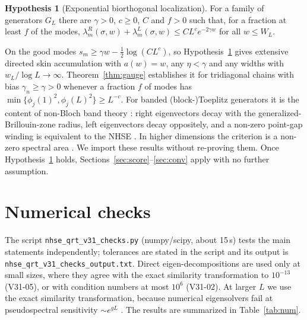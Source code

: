 \documentclass[11pt]{article}
\theoremstyle{definition}
\newtheorem{hypothesis}{Hypothesis}
\theoremstyle{remark}
\begin{document}
\begin{hypothesis}[Exponential biorthogonal localization]\label{hyp:H}
For a family of generators $G_L$ there are $\gamma>0$, $c\ge0$, $C$ and $f>0$ such that, for a fraction at least $f$ of the modes, $\lambda^R_m(\sigma,w)+\lambda^L_m(\sigma,w)\le CL^ce^{-2\gamma w}$ for all $w\le W_L$.
\end{hypothesis}

On the good modes $s_m\ge\gamma w-\frac12\log(CL^c)$, so Hypothesis~\ref{hyp:H} gives extensive directed skin accumulation with $a(w)=w$, any $\eta<\gamma$ and any widths with $w_L/\log L\to\infty$. Theorem~\ref{thm:gauge} establishes it for tridiagonal chains with bias $\gamma_n\ge\gamma>0$ whenever a fraction $f$ of modes has $\min\{\phi_j(1)^2,\phi_j(L)^2\}\ge L^{-c}$. For banded (block-)Toeplitz generators it is the content of non-Bloch band theory \cite{YW18,YM19,LT19}: right eigenvectors decay with the generalized-Brillouin-zone radius, left eigenvectors decay oppositely, and a non-zero point-gap winding is equivalent to the NHSE \cite{OKSS20,ZYF20}. In higher dimensions the criterion is a non-zero spectral area \cite{ZYF22}. We import these results without re-proving them. Once Hypothesis~\ref{hyp:H} holds, Sections~\ref{sec:score}--\ref{sec:conv} apply with no further assumption.

\section{Numerical checks}
\label{sec:num}

The script \texttt{nhse\_qrt\_v31\_checks.py} (numpy/scipy, about 15\,s) tests the main statements independently; tolerances are stated in the script and its output is \texttt{nhse\_qrt\_v31\_checks\_output.txt}. Direct eigen-decompositions are used only at small sizes, where they agree with the exact similarity transformation to $10^{-13}$ (V31-05), or with condition numbers at most $10^6$ (V31-02). At larger $L$ we use the exact similarity transformation, because numerical eigensolvers fail at pseudospectral sensitivity $\sim e^{gL}$ \cite{TE05}. The results are summarized in Table~\ref{tab:num}.
\end{document}
